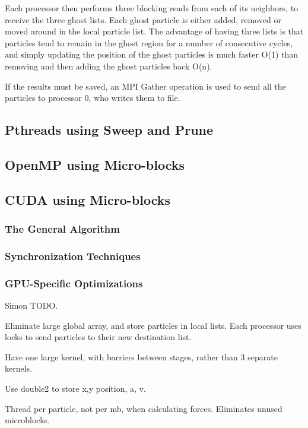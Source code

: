 \documentclass[11pt]{article} %
\begin{document}
Each processor then performs three blocking reads from each of its neighbors, to receive the three ghost lists. Each ghost particle is either added, removed or moved around in the local particle list. The advantage of having three lists is that particles tend to remain in the ghost region for a number of consecutive cycles, and simply updating the position of the ghost particles is much faster O(1) than removing and then adding the ghost particles back O(n).

If the results must be saved, an MPI Gather operation is used to send all the particles to processor 0, who writes them to file.

\subsection{Pthreads using Sweep and Prune}

\subsection{OpenMP using Micro-blocks}

\subsection{CUDA using Micro-blocks}

\subsubsection{The General Algorithm}

\subsubsection{Synchronization Techniques}

\subsubsection{GPU-Specific Optimizations}

Simon TODO.

Eliminate large global array, and store particles in local lists. Each processor uses locks to send particles to their new destination list.

Have one large kernel, with barriers between stages, rather than 3 separate kernels.

Use double2 to store x,y position, a, v.

Thread per particle, not per mb, when calculating forces. Eliminates unused microblocks.
\end{document}
